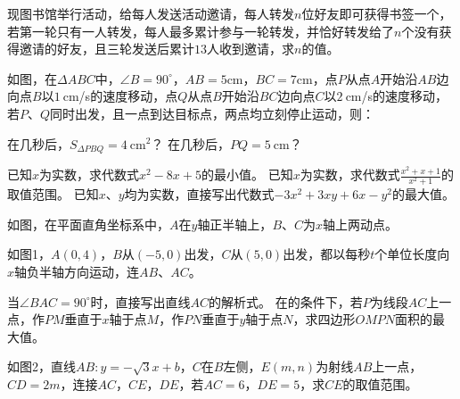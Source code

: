 \documentclass[10pt]{article}
\begin{document}
\begin{questions}{\answeringintroduction}
\begin{subquestions}
        \subquestion 现图书馆举行活动，给每人发送活动邀请，每人转发$n$位好友即可获得书签一个，若第一轮只有一人转发，每人最多累计参与一轮转发，并恰好转发给了$n$个没有获得邀请的好友，且三轮发送后累计$13$人收到邀请，求$n$的值。
    \end{subquestions}
    \addspace{}
    \question 如图，在$\Delta ABC$中，$\angle B=90^{\circ}$，$AB=5$cm，$BC=7$cm，点$P$从点$A$开始沿$AB$边向点$B$以$1\ $cm/s的速度移动，点$Q$从点$B$开始沿$BC$边向点$C$以$2\ $cm/s的速度移动，若$P$、$Q$同时出发，且一点到达目标点，两点均立刻停止运动，则：
    \begin{subquestions}
        \subquestion 在几秒后，$S_{\Delta PBQ}=4\ $cm$^2$？
        \subquestion 在几秒后，$PQ=5\ $cm？
    \end{subquestions}
    \begin{figure}[!h]
        \raggedleft
    \end{figure}
    \newpage
    \question
    \begin{subquestions}
        \subquestion 已知$x$为实数，求代数式$x^2-8x+5$的最小值。
        \subquestion 已知$x$为实数，求代数式$\frac{x^2+x+1}{x^2+1}$的取值范围。
        \subquestion 已知$x$、$y$均为实数，直接写出代数式$-3x^2+3xy+6x-y^2$的最大值。
    \end{subquestions}
    \addspace{}
    \question 如图，在平面直角坐标系中，$A$在$y$轴正半轴上，$B$、$C$为$x$轴上两动点。
    \begin{subquestions}
        \subquestion 如图1，$A(0,4)$，$B$从$(-5,0)$出发，$C$从$(5,0)$出发，都以每秒$t$个单位长度向$x$轴负半轴方向运动，连$AB$、$AC$。
        \begin{subsubquestions}
            \subsubquestion 当$\angle BAC=90^{\circ}$时，直接写出直线$AC$的解析式。
            \subsubquestion 在的条件下，若$P$为线段$AC$上一点，作$PM$垂直于$x$轴于点$M$，作$PN$垂直于$y$轴于点$N$，求四边形$OMPN$面积的最大值。
        \end{subsubquestions}
        \subquestion 如图2，直线$AB:y=-\sqrt{3}x+b$，$C$在$B$左侧，$E(m,n)$为射线$AB$上一点，$CD=2m$，连接$AC$，$CE$，$DE$，若$AC=6$，$DE=5$，求$CE$的取值范围。
    \end{subquestions}

\end{questions}
\end{document}
